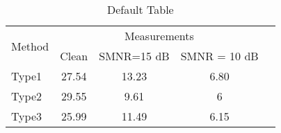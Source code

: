\documentclass[a4paper,11pt]{article}
\begin{document}
 
\begin{table}[htbp]
\caption{Default Table}
\label{Tab:SRNRValues}
\begin{center}
\begin{tabular}{|p{5cm} c|c|c|c|}
\hline
\multirow{2}{1.5cm}{Method}& \multicolumn{3}{p{5cm}|}{\centering Measurements} \\
\cline{2-4} & \multicolumn{1}{c|}{Clean} & \multicolumn{1}{c|}{SMNR=15 dB} & \multicolumn{1}{c|}{SMNR = 10 dB} \\ \hline
Type1 & 27.54 & 13.23 & 6.80 \\
Type2 & 29.55 & 9.61 & 6 \\
Type3 & 25.99 & 11.49 & 6.15 \\
\hline
\end{tabular}
\end{center}
\end{table}
 
\end{document}
